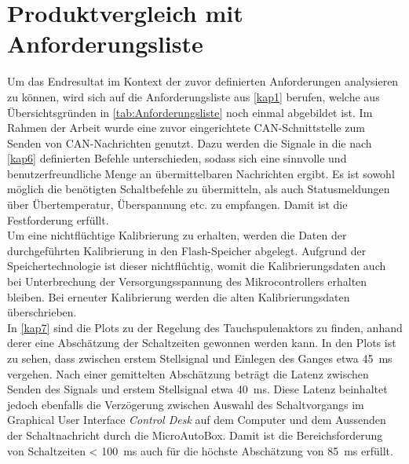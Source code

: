 \section{Produktvergleich mit Anforderungsliste}
Um das Endresultat im Kontext der zuvor definierten Anforderungen analysieren zu können, wird sich auf die Anforderungsliste aus \autoref{kap1} berufen, welche aus Übersichtsgründen in \autoref{tab:Anforderungsliste} noch einmal abgebildet ist. Im Rahmen der Arbeit wurde eine zuvor eingerichtete CAN-Schnittstelle zum Senden von CAN-Nachrichten genutzt. Dazu werden die Signale in die nach \autoref{kap6} definierten Befehle unterschieden, sodass sich eine sinnvolle und benutzerfreundliche Menge an übermittelbaren Nachrichten ergibt. Es ist sowohl möglich die benötigten Schaltbefehle zu übermitteln, als auch Statusmeldungen über Übertemperatur, Überspannung etc. zu empfangen. Damit ist die Festforderung erfüllt.\\
Um eine nichtflüchtige Kalibrierung zu erhalten, werden die Daten der durchgeführten Kalibrierung in den Flash-Speicher abgelegt. Aufgrund der Speichertechnologie ist dieser nichtflüchtig, womit die Kalibrierungsdaten auch bei Unterbrechung der Versorgungsspannung des Mikrocontrollers erhalten bleiben. Bei erneuter Kalibrierung werden die alten Kalibrierungsdaten überschrieben.\\
In \autoref{kap7} sind die Plots zu der Regelung des Tauchspulenaktors zu finden, anhand derer eine Abschätzung der Schaltzeiten gewonnen werden kann. In den Plots ist zu sehen, dass zwischen erstem Stellsignal und Einlegen des Ganges etwa \SI{45}{ms} vergehen. Nach einer gemittelten Abschätzung beträgt die Latenz zwischen Senden des Signals und erstem Stellsignal etwa \SI{40}{ms}. Diese Latenz beinhaltet jedoch ebenfalls die Verzögerung zwischen Auswahl des Schaltvorgangs im Graphical User Interface \textit{Control Desk} auf dem Computer und dem Aussenden der Schaltnachricht durch die MicroAutoBox. Damit ist die Bereichsforderung von Schaltzeiten < \SI{100}{ms} auch für die höchste Abschätzung von \SI{85}{ms} erfüllt.\\
